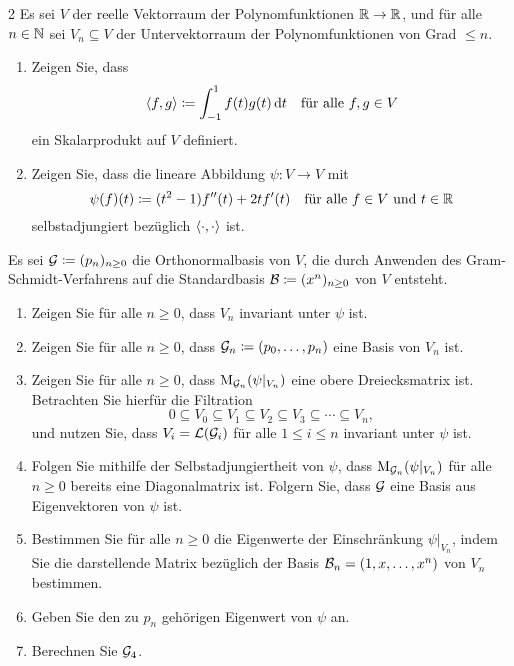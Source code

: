\begin{question}[subtitle = Ein selbstadjungierter Endomorphismus im Unendlichdimensionalen]{2}
  Es sei $V$ der reelle Vektorraum der Polynomfunktionen $\mathbb{R} \to \mathbb{R}$, und für alle $n \in \mathbb{N}$ sei $V_n \subseteq V$ der Untervektorraum der Polynomfunktionen von Grad $\leq n$.
  \begin{enumerate}[leftmargin=*]
    \item
      Zeigen Sie, dass
      \[
                  \left\langle f, g \right\rangle
        \coloneqq \int_{-1}^1 f(t) g(t) \,\text{d}t
        \quad
        \text{für alle $f, g \in V$}
      \]
      ein Skalarprodukt auf $V$ definiert.
    \item
      Zeigen Sie, dass die lineare Abbildung $\psi \colon V \to V$ mit
      \[
        \psi(f)(t) \coloneqq (t^2 - 1) f''(t) + 2t f'(t)
        \quad
        \text{für alle $f \in V$ und $t \in \mathbb{R}$}
      \]
      selbstadjungiert bezüglich $\left\langle \cdot, \cdot \right\rangle$ ist.
  \end{enumerate}
  Es sei $\mathcal{G} \coloneqq (p_n)_{n \geq 0}$ die Orthonormalbasis von $V$, die durch Anwenden des Gram-Schmidt-Verfahrens auf die Standardbasis $\mathcal{B} \coloneqq (x^n)_{n \geq 0}$ von $V$ entsteht.
  \begin{enumerate}[resume, leftmargin=*]
    \item
      Zeigen Sie für alle $n \geq 0$, dass $V_n$ invariant unter $\psi$ ist.
    \item
      Zeigen Sie für alle $n \geq 0$, dass $\mathcal{G}_n \coloneqq (p_0, \dotsc, p_n)$ eine Basis von $V_n$ ist.
    \item
      Zeigen Sie für alle $n \geq 0$, dass $\operatorname{M}_{\mathcal{G}_n}(\psi|_{V_n})$ eine obere Dreiecksmatrix ist.
      Betrachten Sie hierfür die Filtration
      \[
        0 \subseteq V_0 \subseteq V_1 \subseteq V_2 \subseteq V_3 \subseteq \dotsb \subseteq V_n,
      \]
      und nutzen Sie, dass $V_i = \operatorname{\mathcal{L}}(\mathcal{G}_i)$ für alle $1 \leq i \leq n$ invariant unter $\psi$ ist.
    \item
      Folgen Sie mithilfe der Selbstadjungiertheit von $\psi$, dass $\operatorname{M}_{\mathcal{G}_n}(\psi|_{V_n})$ für alle $n \geq 0$ bereits eine Diagonalmatrix ist.
      Folgern Sie, dass $\mathcal{G}$ eine Basis aus Eigenvektoren von $\psi$ ist.
    \item
      Bestimmen Sie für alle $n \geq 0$ die Eigenwerte der Einschränkung $\psi|_{V_n}$, indem Sie die darstellende Matrix bezüglich der Basis $\mathcal{B}_n = (1, x, \dotsc, x^n)$ von $V_n$ bestimmen.
    \item
      Geben Sie den zu $p_n$ gehörigen Eigenwert von $\psi$ an.
    \item
      Berechnen Sie $\mathcal{G}_4$.
  \end{enumerate}
\end{question}


